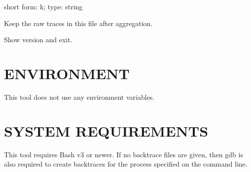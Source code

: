 \documentclass[letterpaper,10pt,english]{sphinxmanual}
\begin{document}

\begin{fulllineitems}
\label{\detokenize{mariadb-stacktrace:cmdoption-mariadb-stacktrace-save-samples}}
short form: \sphinxhyphen{}k; type: string

Keep the raw traces in this file after aggregation.

\end{fulllineitems}


\begin{fulllineitems}
\label{\detokenize{mariadb-stacktrace:cmdoption-mariadb-stacktrace-version}}
Show version and exit.

\end{fulllineitems}



\section{ENVIRONMENT}
\label{\detokenize{mariadb-stacktrace:environment}}
This tool does not use any environment variables.


\section{SYSTEM REQUIREMENTS}
\label{\detokenize{mariadb-stacktrace:system-requirements}}
This tool requires Bash v3 or newer.  If no backtrace files are given,
then gdb is also required to create backtraces for the process specified
on the command line.
\end{document}
